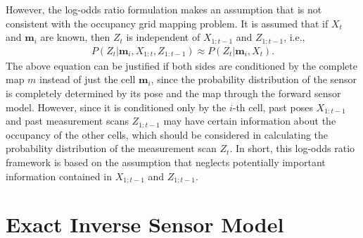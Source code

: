 \documentclass[letterpaper, 10pt, conference]{ieeeconf}
\begin{document}
However, the log-odds ratio formulation makes an assumption that is not consistent with the occupancy grid mapping problem. It is assumed that if $X_t$ and $\mathbf{m}_i$ are known, then $Z_t$ is independent of $X_{1:t-1}$ and $Z_{1:t-1}$, i.e.,
\begin{align}
\label{eqn:AssumptionEarly}
P(Z_t|\mathbf{m}_i,X_{1:t},Z_{1:t-1})\approx P(Z_t|\mathbf{m}_i,X_t).
\end{align}
The above equation can be justified if both sides are conditioned by the complete map $m$ instead of just the cell $\mathbf{m}_i$, since the probability distribution of the sensor is completely determined by its pose and the map through the forward sensor model. However, since it is conditioned only by the $i$-th cell, past poses $X_{1:t-1}$ and past measurement scans $Z_{1:t-1}$ may have certain information about the occupancy of the other cells, which should be considered in calculating the probability distribution of the measurement scan $Z_t$.  In short, this log-odds ratio framework is based on the assumption that neglects potentially important information contained in $X_{1:t-1}$ and $Z_{1:t-1}$.




	
	
\section{Exact Inverse Sensor Model}
\label{sec:ISM}
\end{document}
